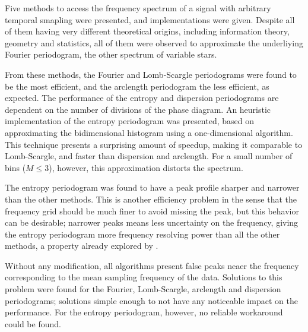 Five methods to access the frequency spectrum of a signal with arbitrary temporal smapling were presented, and implementations were given.
Despite all of them having very different theoretical origins, including information theory, geometry and statistics,
all of them were observed to approximate the underliying Fourier periodogram, the other spectrum of variable stars.

From these methods, the Fourier and Lomb-Scargle periodograms were found to be the most efficient, 
and the arclength periodogram the less efficient, as expected.
The performance of the entropy and dispersion periodograms are dependent on the number of divisions of the phase diagram.
An heuristic implementation of the entropy periodogram was presented, based on approximating the bidimensional histogram using a one-dimensional algorithm.
This technique presents a surprising amount of speedup, making it comparable to Lomb-Scargle, and faster than dispersion and arclength. 
For a small number of bins ($M\leq3$), however, this approximation distorts the spectrum.

The entropy periodogram was found to have a peak profile sharper and narrower than the other methods.
This is another efficiency problem in the sense that the frequency grid should be much finer to avoid missing the peak,
but this behavior can be desirable; narrower peaks means less uncertainty on the frequency, 
giving the entropy periodogram more frequency resolving power than all the other methods, a property already explored by \cite{Cincotta1999II}.

Without any modification, all algorithms present false peaks neaer the frequency corresponding to the mean sampling frequency of the data.
Solutions to this problem were found for the Fourier, Lomb-Scargle, arclength and dispersion periodograms; 
solutions simple enough to not have any noticeable impact on the performance.
For the entropy periodogram, however, no reliable workaround could be found.





